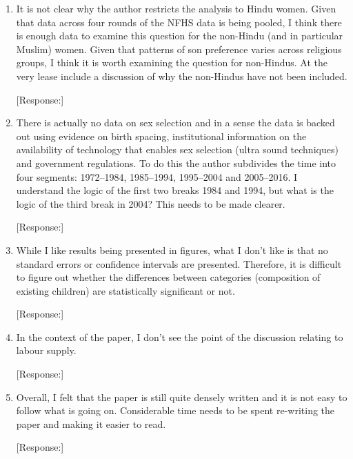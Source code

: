 \documentclass[letterpaper,12pt]{article}
\begin{document}
\begin{enumerate}

\item It is not clear why the author restricts the analysis to Hindu
women. Given that data across four rounds of the NFHS data is being
pooled, I think there is enough data to examine this question for the
non-Hindu (and in particular Muslim) women. Given that patterns of son
preference varies across religious groups, I think it is worth examining
the question for non-Hindus. At the very lease include a discussion of
why the non-Hindus have not been included.

[Response:]

\item There is actually no data on sex selection and in a sense the data
is backed out using evidence on birth spacing, institutional information
on the availability of technology that enables sex selection (ultra
sound techniques) and government regulations. To do this the author
subdivides the time into four segments: 1972--1984, 1985--1994, 1995--2004
and 2005--2016. I understand the logic of the first two breaks 1984 and
1994, but what is the logic of the third break in 2004? This needs to be
made clearer.

[Response:]

\item While I like results being presented in figures, what I don’t like
is that no standard errors or confidence intervals are presented.
Therefore, it is difficult to figure out whether the differences between
categories (composition of existing children) are statistically
significant or not.

[Response:]

\item In the context of the paper, I don’t see the point of the
discussion relating to labour supply.

[Response:]

\item Overall, I felt that the paper is still quite densely written and
it is not easy to follow what is going on. Considerable time needs to be
spent re-writing the paper and making it easier to read.

[Response:]

\end{enumerate}



\newpage


\end{document}

